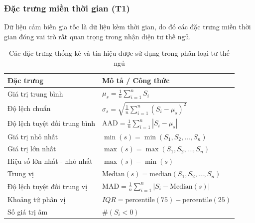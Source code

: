 \subsubsection{Đặc trưng miền thời gian (T1)}\label{AA}
Dữ liệu cảm biến gia tốc là dữ liệu kèm thời gian, do đó các đặc trưng miền
thời gian đóng vai trò rất quan trọng trong nhận diện tư thế ngủ.
\begin{table}[H]
    \caption{Các đặc trưng thống kê và tín hiệu được sử dụng trong phân loại tư thế ngủ}
    \label{tab:features}
    \begin{center}
        \renewcommand{\arraystretch}{1.5}
        \begin{tabular}{|l|p{9.5cm}|}
            \hline
            \textbf{Đặc trưng}            & \textbf{Mô tả / Công thức}                                         \\
            \hline
            Giá trị trung bình            & $\mu_s = \frac{1}{n} \sum_{i=1}^{n} S_i$                           \\
            \hline
            Độ lệch chuẩn                 & $\sigma_s = \sqrt{\frac{1}{n} \sum_{i=1}^{n} (S_i - \mu_s)^2}$     \\
            \hline
            Độ lệch tuyệt đối trung bình  & $\text{AAD} = \frac{1}{n} \sum_{i=1}^{n} |S_i - \mu_s|$            \\
            \hline
            Giá trị nhỏ nhất              & $\min(s) = \min(S_1, S_2, \ldots, S_n)$                            \\
            \hline
            Giá trị lớn nhất              & $\max(s) = \max(S_1, S_2, \ldots, S_n)$                            \\
            \hline
            Hiệu số lớn nhất - nhỏ nhất   & $\max(s) - \min(s)$                                                \\
            \hline
            Trung vị                      & $\text{Median}(s) = \text{median}(S_1, S_2, \ldots, S_n)$          \\
            \hline
            Độ lệch tuyệt đối trung vị    & $\text{MAD} = \frac{1}{n} \sum_{i=1}^{n} |S_i - \text{Median}(s)|$ \\
            \hline
            Khoảng tứ phân vị             & $IQR = \text{percentile}(75) - \text{percentile}(25)$              \\
            \hline
            Số giá trị âm                 & $\#(S_i < 0)$                                                      \\

\end{tabular}
\end{center}
\end{table}
